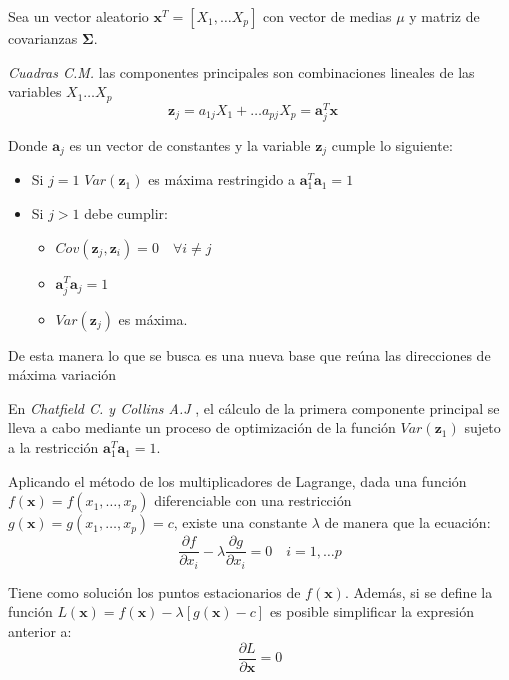 \noindent Sea un vector aleatorio $\textbf{x}^T=[X_1,\ldots X_p]$ con vector de medias $\mu$ y matriz de covarianzas $\mathbf{\Sigma}$.
\begin{defi}
\emph{Cuadras C.M.} \cite{Cuadras 2014}las componentes principales son combinaciones lineales de las variables $X_1 \ldots X_p$
\begin{equation}
\textbf{z}_j=a_{1j}X_1+\ldots a_{pj}X_p=\textbf{a}_j^T\textbf{x}\quad 
\end{equation}

\noindent Donde $\textbf{a}_j$ es un vector de constantes y la variable $\textbf{z}_j$ cumple lo siguiente:
\begin{itemize}
\item Si $j=1$ $Var(\textbf{z}_1)$ es máxima restringido a $\textbf{a}_1^T \textbf{a}_1=1$
\item Si $j>1$ debe cumplir:
\begin{itemize}
\item $Cov(\textbf{z}_j,\textbf{z}_i)=0\quad \forall i\neq j $
\item $\textbf{a}_j^T \textbf{a}_j=1$
\item $Var(\textbf{z}_j)$ es máxima. 
\end{itemize}
\end{itemize}
\noindent De esta manera lo que se busca es una nueva base que reúna las direcciones de máxima variación 
\end{defi}

\noindent En \emph{Chatfield C. y Collins A.J} \cite{Chatfield 1989},  el cálculo de la primera componente principal se lleva a cabo mediante un proceso de optimización de la función $Var(\textbf{z}_1)$ sujeto a la restricción $\textbf{a}_1^T\textbf{a}_1=1$. 

\noindent Aplicando el método de los multiplicadores de Lagrange,  dada una función $f(\textbf{x})=f(x_1,\ldots, x_p)$ diferenciable con una restricción $g(\textbf{x})=g(x_1, \ldots, x_p)=c$,  existe una constante $\lambda$ de manera que la ecuación:
\begin{equation}
\dfrac{\partial f}{\partial x_i}-\lambda\dfrac{\partial g}{\partial x_i}=0 \quad i=1,\ldots p 
\end{equation}

\noindent Tiene como solución los puntos estacionarios de $f(\textbf{x})$. Además, si se define la función $L(\textbf{x})= f(\textbf{x})-\lambda[g(\textbf{x})-c]$  es posible simplificar la expresión anterior a:
\begin{equation}
\dfrac{\partial L}{\partial \textbf{x}}=0
\end{equation}

